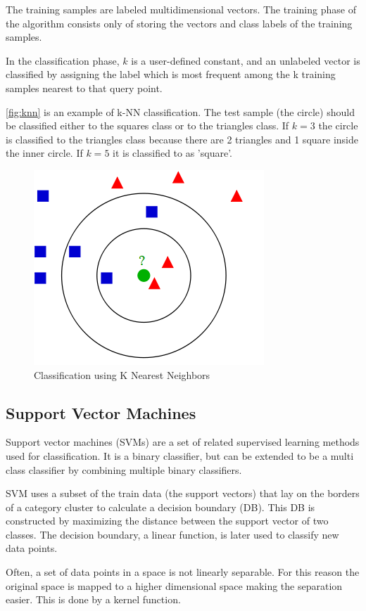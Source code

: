 The training samples are labeled multidimensional vectors. The training phase of the algorithm consists only of storing the vectors and class labels of the training samples.

In the classification phase, $k$ is a user-defined constant, and an unlabeled vector is classified by assigning the label which is most frequent among the k training samples nearest to that query point.



\autoref{fig:knn} is an example of k-NN classification. The test sample (the circle) should be classified either to the squares class or to the triangles class. If $k = 3$ the circle is classified to the triangles class because there are 2 triangles and 1 square inside the inner circle. If $k = 5$ it is classified to as 'square'.

\begin{figure}[htbp]
\center{}
\includegraphics[width=0.3\linewidth]{figures/knn.png}
\caption{Classification using K Nearest Neighbors}
\label{fig:knn}
\end{figure}

\subsection*{Support Vector Machines}

Support vector machines (SVMs) are a set of related supervised learning methods used for classification. It is a binary classifier, but can be extended to be a multi class classifier by combining multiple binary classifiers. 

SVM uses a subset of the train data (the support vectors) that lay on the borders of a category cluster to calculate a decision boundary (DB). This DB is constructed by maximizing the distance between the support vector of two classes. The decision boundary, a linear function, is later used to classify new data points.

Often, a set of data points in a space is not linearly separable. For this reason the original space is mapped to a higher dimensional space making the separation easier. This is done by a kernel function.


